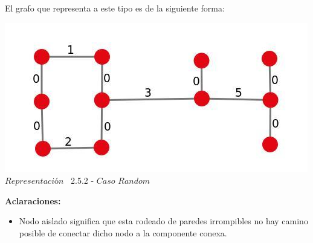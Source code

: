 El grafo que representa a este tipo es de la siguiente forma:\\

\vspace*{0.3cm} \vspace*{0.3cm}
  \begin{center}
 \includegraphics[scale=0.5]{./EJ2/ej2graforandom.jpeg}
 \\{$Representación$ \ 2.5.2 - $Caso$ $Random$}
  \end{center}
  \vspace*{0.3cm}


\textbf{Aclaraciones:} 
\begin{itemize}
\item Nodo aislado significa que esta rodeado de paredes irrompibles no hay camino posible de conectar dicho nodo a la componente conexa.
\end{itemize}